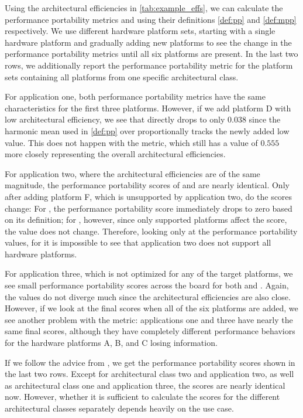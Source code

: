 Using the architectural efficiencies in \autoref{tab:example_effs}, we can calculate the performance portability metrics \pp and \mpp using their definitions \autoref{def:pp} and \autoref{def:mpp} respectively. 
We use different hardware platform sets, starting with a single hardware platform and gradually adding new platforms to see the change in the performance portability metrics until all six platforms are present. 
In the last two rows, we additionally report the performance portability metric for the platform sets containing all platforms from one specific architectural class. 

For application one, both performance portability metrics have the same characteristics for the first three platforms. 
However, if we add platform D with low architectural efficiency, we see that \pp directly drops to only $\num{0.038}$ since the harmonic mean used in \autoref{def:pp} over proportionally tracks the newly added low value. 
This does not happen with the \mpp metric, which still has a value of $\num{0.555}$ more closely representing the overall architectural efficiencies. 

For application two, where the architectural efficiencies are of the same magnitude, the performance portability scores of \pp and \mpp are nearly identical. 
Only after adding platform F, which is unsupported by application two, do the scores change: For \pp, the performance portability score immediately drops to zero based on its definition; for \mpp, however, since only supported platforms affect the \mpp score, the value does not change. 
Therefore, looking only at the performance portability values, for \mpp it is impossible to see that application two does not support all hardware platforms. 

For application three, which is not optimized for any of the target platforms, we see small performance portability scores across the board for both \pp and \mpp. 
Again, the values do not diverge much since the architectural efficiencies are also close. 
However, if we look at the final scores when all of the six platforms are added, we see another problem with the \pp metric: applications one and three have nearly the same final scores, although they have completely different performance behaviors for the hardware platforms A, B, and C losing information. 

If we follow the advice from \citet{marowka_toward_2021}, we get the performance portability scores shown in the last two rows. 
Except for architectural class two and application two, as well as architectural class one and application three, the scores are nearly identical now. 
However, whether it is sufficient to calculate the scores for the different architectural classes separately depends heavily on the use case. 

